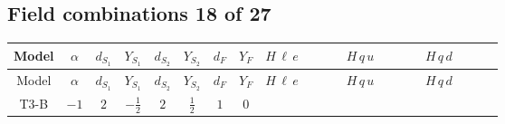 \documentclass[8pt]{article}
\begin{document}
\begin{landscape}
\subsection*{Field combinations 18 of 27}
\begin{longtable}{@{}cccccccc >{\raggedright\arraybackslash}p{0.21\linewidth} >{\raggedright\arraybackslash}p{0.21\linewidth} >{\raggedright\arraybackslash}p{0.21\linewidth}@{}}
\toprule
Model & $\alpha$ & $d_{S_1}$ & $Y_{S_1}$ & $d_{S_2}$ & $Y_{S_2}$ & $d_F$ & $Y_F$ & $H\,\ell\,e$ & $H\,q\,u$ & $H\,q\,d$ \\
\midrule
\endfirsthead
\toprule
Model & $\alpha$ & $d_{S_1}$ & $Y_{S_1}$ & $d_{S_2}$ & $Y_{S_2}$ & $d_F$ & $Y_F$ & $H\,\ell\,e$ & $H\,q\,u$ & $H\,q\,d$ \\
\midrule
\endhead
T3-B & $-1$ & $2$ & $-\frac{1}{2}$ & $2$ & $\frac{1}{2}$ & $1$ & $0$ & \scriptsize\adjustbox{max width=\linewidth}{$\begin{gathered} +\frac{\hbar  \overline{L_{a_2,i_2}}\, P_R\, e_{i_1} H_{a_1} H_{a_2} Y_{e,i_2,i_1} H_{a_1}{}^{\dagger } g_2^4}{480 m_1^2} \\ +\frac{\hbar  \overline{Y_{e,i_1,i_2}} \overline{e_{i_2}}\, P_L\, L_{a_1,i_1} H_{a_2} H_{a_1}{}^{\dagger } H_{a_2}{}^{\dagger } g_2^4}{480 m_1^2} \\ +\frac{\hbar  \overline{y_{1,i_3,r_1}} \overline{L_{a_1,i_2}}\, P_R\, e_{i_1} H_{a_1} y_{1,i_2,r_1} Y_{e,i_3,i_1}}{4 \epsilon }\end{gathered}$} & \scriptsize\adjustbox{max width=\linewidth}{$\begin{gathered} +\frac{\hbar  \overline{Y_{u,i_1,i_2}} \overline{u_{\alpha _1,i_2}}\, P_L\, q_{\alpha _1,a_2,i_1} H_{a_1} H_{a_3} \epsilon_{a_2,a_3} H_{a_1}{}^{\dagger } g_2^4}{480 m_1^2} \\ +\frac{\hbar  \overline{q_{\alpha _1,a_3,i_2}}\, P_R\, u_{\alpha _1,i_1} H_{a_2} Y_{u,i_2,i_1} \epsilon_{a_3,a_1} H_{a_1}{}^{\dagger } H_{a_2}{}^{\dagger } g_2^4}{480 m_1^2} \\ +\frac{\hbar  \overline{Y_{u,i_1,i_2}} \overline{u_{\alpha _1,i_2}}\, P_L\, q_{\alpha _1,a_2,i_1} g_1^4 H_{a_1} H_{a_3} \epsilon_{a_2,a_3} H_{a_1}{}^{\dagger }}{480 m_1^2}\end{gathered}$} & \scriptsize\adjustbox{max width=\linewidth}{$\begin{gathered} \frac{\hbar  \overline{q_{\alpha _1,a_2,i_2}}\, P_R\, d_{\alpha _1,i_1} H_{a_1} H_{a_2} Y_{d,i_2,i_1} H_{a_1}{}^{\dagger } g_2^4}{480 m_1^2} \\ +\frac{\hbar  \overline{Y_{d,i_1,i_2}} \overline{d_{\alpha _1,i_2}}\, P_L\, q_{\alpha _1,a_1,i_1} H_{a_2} H_{a_1}{}^{\dagger } H_{a_2}{}^{\dagger } g_2^4}{480 m_1^2} \\ +\frac{\hbar  \overline{q_{\alpha _1,a_2,i_2}}\, P_R\, d_{\alpha _1,i_1} g_1^4 H_{a_1} H_{a_2} Y_{d,i_2,i_1} H_{a_1}{}^{\dagger }}{480 m_1^2}\end{gathered}$} \\

\end{longtable}
\end{landscape}
\end{document}
